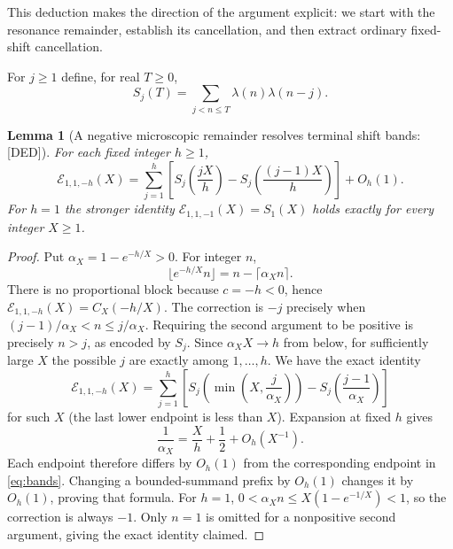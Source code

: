 \documentclass[11pt,a4paper]{article}
\numberwithin{equation}{section}
\newtheorem{lemma}[theorem]{Lemma}
\theoremstyle{remark}\newtheorem{remark}[theorem]{Remark}
\newcommand{\1}{\mathbf 1}
\begin{document}
This deduction makes the direction of the argument explicit:
we start with the resonance remainder, establish its cancellation,
and then extract ordinary fixed-shift cancellation.

For $j\ge1$ define, for real $T\ge0$,
\begin{equation}\label{eq:Sj}
 S_j(T)=\sum_{j<n\le T}\lambda(n)\lambda(n-j).
\end{equation}
\begin{lemma}[A negative microscopic remainder resolves terminal shift bands:
{\rm[DED]}]
\label{lem:bands}
For each fixed integer $h\ge1$,
\begin{equation}\label{eq:bands}
 \mathcal E_{1,1,-h}(X)
 =\sum_{j=1}^h
 \left[S_j\left(\frac{jX}{h}\right)
       -S_j\left(\frac{(j-1)X}{h}\right)\right]+O_h(1).
\end{equation}
For $h=1$ the stronger identity
$\mathcal E_{1,1,-1}(X)=S_1(X)$ holds exactly for every integer $X\ge1$.
\end{lemma}
\begin{proof}
Put $\alpha_X=1-e^{-h/X}>0$. For integer $n$,
\[
 \lfloor e^{-h/X}n\rfloor=n-\lceil\alpha_X n\rceil.
\]
There is no proportional block because $c=-h<0$, hence
$\mathcal E_{1,1,-h}(X)=C_X(-h/X)$. The correction is $-j$ precisely
when $(j-1)/\alpha_X<n\le j/\alpha_X$. Requiring the second argument
to be positive is precisely $n>j$, as encoded by $S_j$.
Since $\alpha_XX\to h$ from below, for sufficiently large $X$ the
possible $j$ are exactly among $1,\ldots,h$. We have the exact identity
\begin{equation}\label{eq:exactbands}
 \mathcal E_{1,1,-h}(X)=\sum_{j=1}^h
 \left[S_j\left(\min\left(X,\frac j{\alpha_X}\right)\right)
       -S_j\left(\frac{j-1}{\alpha_X}\right)\right]
\end{equation}
for such $X$ (the last lower endpoint is less than $X$).
Expansion at fixed $h$ gives
\[
 \frac1{\alpha_X}=\frac Xh+\frac12+O_h(X^{-1}).
\]
Each endpoint therefore differs by $O_h(1)$ from the corresponding
endpoint in \eqref{eq:bands}. Changing a bounded-summand prefix by
$O_h(1)$ changes it by $O_h(1)$, proving that formula.
For $h=1$, $0<\alpha_X n\le X(1-e^{-1/X})<1$, so the correction
is always $-1$. Only $n=1$ is omitted for a nonpositive second
argument, giving the exact identity claimed.
\end{proof}
\end{document}
